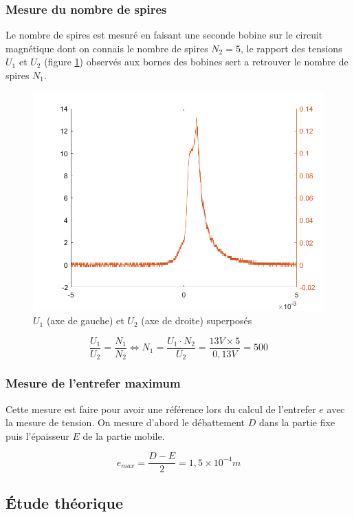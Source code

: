 \documentclass{rapportENS}
\begin{document}
 
 
 \subsubsection*{Mesure du nombre de spires}
 
 Le nombre de spires est mesuré en faisant une seconde bobine sur le circuit magnétique dont on connais le nombre de spires $N_2 = 5$, le rapport des tensions $U_1$ et $U_2$ (figure \ref{nombredespire}) observés aux bornes des bobines sert a retrouver le nombre de spires $N_1$.
 
 \begin{figure}[h!]
  \centering
 \includegraphics[width = .5\linewidth]{nombredespire.png}
 \caption{$U_1$ (axe de gauche) et $U_2$ (axe de droite) superposés}
 \label{nombredespire}
 \end{figure}
 
 \begin{equation}
     \frac{U_1}{U_2} = \frac{N_1}{N_2} \Leftrightarrow N_1 = \frac{U_1\cdot N_2}{U_2} = \frac{13V \times 5}{0,13V} = 500
 \end{equation}
 
 \subsubsection*{Mesure de l'entrefer maximum}
 
 Cette mesure est faire pour avoir une référence lors du calcul de l'entrefer $e$ avec la mesure de tension. On mesure d'abord le débattement $D$ dans la partie fixe puis l'épaisseur $E$ de la partie mobile.
 
 \begin{equation}
     e_{max} = \frac{D-E}{2} = 1,5\times 10^{-4} m
 \end{equation}
 
 \subsection{Étude théorique}
 
\end{document}
